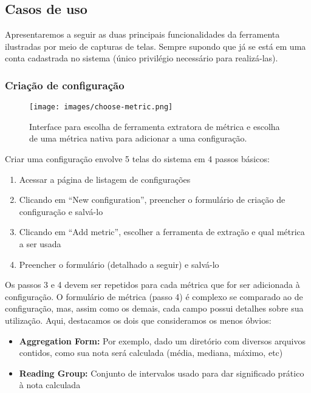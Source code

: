 \documentclass[12pt]{article}
\begin{document}
  \subsection{Casos de uso}
  Apresentaremos a seguir as duas principais funcionalidades da ferramenta ilustradas por meio de capturas de telas. Sempre supondo que já se está em uma conta cadastrada no sistema (único privilégio necessário para realizá-las).
    \subsubsection{Criação de configuração}
    \begin{figure}[H]
      \centering
      \texttt{[image: images/choose-metric.png]}
      \caption{Interface para escolha de ferramenta extratora de métrica e escolha de uma métrica nativa para adicionar a uma configuração.}
      \label{fig:choose-metric}
    \end{figure}
    Criar uma configuração envolve 5 telas do sistema em 4 passos básicos:
    \begin{enumerate}
      \item Acessar a página de listagem de configurações
      \item Clicando em ``New configuration'', preencher o formulário de criação de configuração e salvá-lo
      \item Clicando em ``Add metric'', escolher a ferramenta de extração e qual métrica a ser usada
      \item Preencher o formulário (detalhado a seguir) e salvá-lo
    \end{enumerate}
    Os passos 3 e 4 devem ser repetidos para cada métrica que for ser adicionada à configuração. O formulário de métrica (passo 4) é complexo se comparado ao de configuração, mas, assim como os demais, cada campo possui detalhes sobre sua utilização. Aqui, destacamos os dois que consideramos os menos óbvios:
    \begin{itemize}
      \item \textbf{Aggregation Form:} Por exemplo, dado um diretório com diversos arquivos contidos, como sua nota será calculada (média, mediana, máximo, etc)
      \item \textbf{Reading Group:} Conjunto de intervalos usado para dar significado prático à nota calculada
    \end{itemize}
\end{document}
